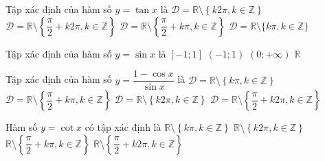 \begin{ex}%
	Tập xác định  của hàm số $y=\tan x$ là
	 \choice
		{$\mathscr{D}=\mathbb{R}\setminus\left\{k2\pi  ,k\in\mathbb{Z}\right\}$}
		{$\mathscr{D}=\mathbb{R}\setminus\left\{\dfrac{\pi}{2}+k2\pi  ,k\in\mathbb{Z}\right\}$}
		{\True $\mathscr{D}=\mathbb{R}\setminus\left\{\dfrac{\pi}{2}+k\pi ,k\in\mathbb{Z}\right\}$} 
		 {$\mathscr{D}=\mathbb{R}\setminus\{k\pi ,k\in\mathbb{Z}\}$}
\end{ex}

\begin{ex}%
	Tập xác định của hàm số $y=\sin x$  là
	\choice 
		{$[-1;1]$} 
		 {$(-1;1)$}
		{$(0;+\infty)$} 
		{\True $\mathbb{R}$} 
\end{ex}

\begin{ex}%
	Tập xác  định của hàm số $y=\dfrac{1-\cos x}{\sin x}$ là
	 \choice
		{\True  $\mathscr{D}=\mathbb{R}\setminus\left\{k\pi ,k\in\mathbb{Z}\right\}$}
		 {$\mathscr{D}=\mathbb{R}\setminus\left\{\dfrac{\pi}{2}+k\pi ,k\in\mathbb{Z}\right\}$}
		 {$\mathscr{D}=\mathbb{R}\setminus\left\{k2\pi ,k\in\mathbb{Z}\right\}$}
		{$\mathscr{D}=\mathbb{R}\setminus\left\{\dfrac{\pi}{2}+k2\pi ,k\in\mathbb{Z}\right\}$} 
\end{ex}

\begin{ex}%
	Hàm số $y=\cot x$ có  tập xác định là
	 \choice
		 {\True $\mathbb{R}\setminus \left\{k\pi,k\in \mathbb{Z}\right\}$}
		{$\mathbb{R}\setminus  \left\{k2\pi,k\in \mathbb{Z}\right\}$}
		{$\mathbb{R}\setminus \left\{\dfrac{\pi}{2}+k\pi,k\in \mathbb{Z}\right\}$} 
		{$\mathbb{R}\setminus \left\{\dfrac{\pi}{2}+k2\pi,k\in \mathbb{Z}\right\}$} 
\end{ex}

